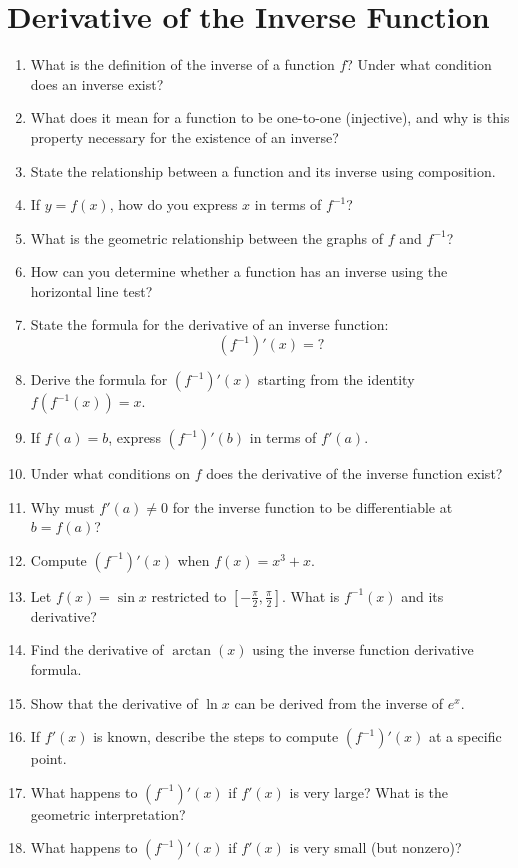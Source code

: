 \section{Derivative of the Inverse Function}
\begin{enumerate}
  \item What is the definition of the inverse of a function $f$? Under what condition does an inverse exist?
  \item What does it mean for a function to be one-to-one (injective), and why is this property necessary for the existence of an inverse?
  \item State the relationship between a function and its inverse using composition.
  \item If $y = f(x)$, how do you express $x$ in terms of $f^{-1}$?
  \item What is the geometric relationship between the graphs of $f$ and $f^{-1}$?
  \item How can you determine whether a function has an inverse using the horizontal line test?
  \item State the formula for the derivative of an inverse function: \[ (f^{-1})'(x) = ? \]
  \item Derive the formula for $\left(f^{-1}\right)'(x)$ starting from the identity $f(f^{-1}(x)) = x$.
  \item If $f(a) = b$, express $\left(f^{-1}\right)'(b)$ in terms of $f'(a)$.
  \item Under what conditions on $f$ does the derivative of the inverse function exist?
  \item Why must $f'(a) \neq 0$ for the inverse function to be differentiable at $b = f(a)$?
  \item Compute $\left(f^{-1}\right)'(x)$ when $f(x) = x^3 + x$.
  \item Let $f(x) = \sin x$ restricted to $\left[-\frac{\pi}{2}, \frac{\pi}{2}\right]$. What is $f^{-1}(x)$ and its derivative?
  \item Find the derivative of $\arctan(x)$ using the inverse function derivative formula.
  \item Show that the derivative of $\ln x$ can be derived from the inverse of $e^x$.
  \item If $f'(x)$ is known, describe the steps to compute $\left(f^{-1}\right)'(x)$ at a specific point.
  \item What happens to $\left(f^{-1}\right)'(x)$ if $f'(x)$ is very large? What is the geometric interpretation?
  \item What happens to $\left(f^{-1}\right)'(x)$ if $f'(x)$ is very small (but nonzero)?

\end{enumerate}
